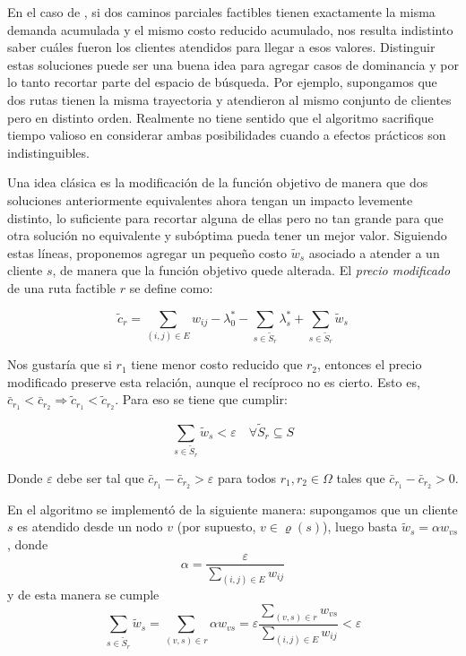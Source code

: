 En el caso de , si dos caminos parciales factibles tienen exactamente la misma demanda acumulada y el mismo costo reducido acumulado, nos resulta indistinto saber cuáles fueron los clientes atendidos para llegar a esos valores. Distinguir estas soluciones puede ser una buena idea para agregar casos de dominancia y por lo tanto recortar parte del espacio de búsqueda. Por ejemplo, supongamos que dos rutas tienen la misma trayectoria y atendieron al mismo conjunto de clientes pero en distinto orden. Realmente no tiene sentido que el algoritmo sacrifique tiempo valioso en considerar ambas posibilidades cuando a efectos prácticos son indistinguibles. 

Una idea clásica es la modificación de la función objetivo de manera que dos soluciones anteriormente equivalentes ahora tengan un impacto levemente distinto, lo suficiente para recortar alguna de ellas pero no tan grande para que otra solución no equivalente y subóptima pueda tener un mejor valor. Siguiendo estas líneas, proponemos agregar un pequeño costo $\tilde{w}_s$ asociado a atender a un cliente $s$, de manera que la función objetivo quede alterada. El \emph{precio modificado} de una ruta factible $r$ se define como:

\begin{equation}
    \tilde{c}_r = \sum_{(i, j) \in E}{w_{ij}} - \lambda^*_0 - \sum_{s \in \tilde{S}_r}{\lambda^*_s} + \sum_{s \in \tilde{S}_r}{\tilde{w}_s}
\end{equation}

Nos gustaría que si $r_1$ tiene menor costo reducido que $r_2$, entonces el precio modificado preserve esta relación, aunque el recíproco no es cierto. Esto es, $\bar{c}_{r_1} < \bar{c}_{r_2} \Rightarrow \tilde{c}_{r_1} < \tilde{c}_{r_2}$. Para eso se tiene que cumplir:

\begin{equation}
    \sum_{s \in \tilde{S}_r}{\tilde{w}_s} < \varepsilon \quad \forall \tilde{S}_r \subseteq S
\end{equation}

Donde $\varepsilon$ debe ser tal que $\bar{c}_{r_1} - \bar{c}_{r_2} > \varepsilon$ para todos $r_1, r_2 \in \Omega$ tales que $\bar{c}_{r_1} - \bar{c}_{r_2} > 0$. 

En el algoritmo se implementó de la siguiente manera: supongamos que un cliente $s$ es atendido desde un nodo $v$ (por supuesto, $v \in \varrho(s)$), luego basta $\tilde{w}_s = \alpha w_{vs}$, donde
\begin{equation}
    \alpha = \frac{\varepsilon}{\sum_{(i,j) \in E}{w_{ij}}}
\end{equation}
y de esta manera se cumple
\begin{equation}
    \sum_{s \in \tilde{S}_r}{\tilde{w}_s} = 
    \sum_{(v, s) \in r}{\alpha w_{vs}} = 
    \varepsilon \frac{\sum_{(v, s) \in r}{w_{vs}}}{\sum_{(i,j) \in E}{w_{ij}}} < 
    \varepsilon
\end{equation}

